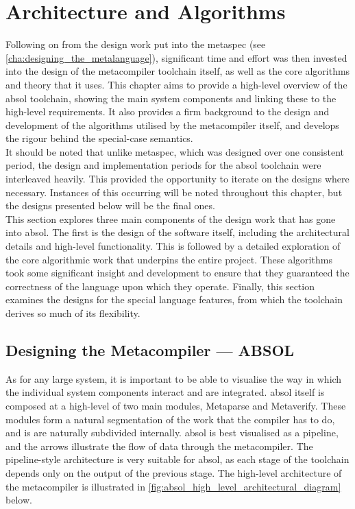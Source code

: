 \chapter{Architecture and Algorithms} %
\label{cha:architecture_and_algorithms}
Following on from the design work put into the \gls{metaspec} (see \autoref{cha:designing_the_metalanguage}), significant time and effort was then invested into the design of the metacompiler toolchain itself, as well as the core algorithms and theory that it uses. 
This chapter aims to provide a high-level overview of the \gls{absol} toolchain, showing the main system components and linking these to the high-level requirements.
It also provides a firm background to the design and development of the algorithms utilised by the metacompiler itself, and develops the rigour behind the special-case semantics. \\

It should be noted that unlike \gls{metaspec}, which was designed over one consistent period, the design and implementation periods for the \gls{absol} toolchain were interleaved heavily.
This provided the opportunity to iterate on the designs where necessary.
Instances of this occurring will be noted throughout this chapter, but the designs presented below will be the final ones. \\

This section explores three main components of the design work that has gone into \gls{absol}.
The first is the design of the software itself, including the architectural details and high-level functionality.
This is followed by a detailed exploration of the core algorithmic work that underpins the entire project.
These algorithms took some significant insight and development to ensure that they guaranteed the correctness of the language upon which they operate.
Finally, this section examines the designs for the special language features, from which the toolchain derives so much of its flexibility.

\section{Designing the Metacompiler --- ABSOL} %
\label{sec:designing_the_metacompiler_absol}
As for any large system, it is important to be able to visualise the way in which the individual system components interact and are integrated. 
\gls{absol} itself is composed at a high-level of two main modules, Metaparse and Metaverify.
These modules form a natural segmentation of the work that the compiler has to do, and is are naturally subdivided internally.
\gls{absol} is best visualised as a pipeline, and the arrows illustrate the flow of data through the metacompiler.
The pipeline-style architecture is very suitable for \gls{absol}, as each stage of the toolchain depends only on the output of the previous stage.
The high-level architecture of the metacompiler is illustrated in \autoref{fig:absol_high_level_architectural_diagram} below.\\

